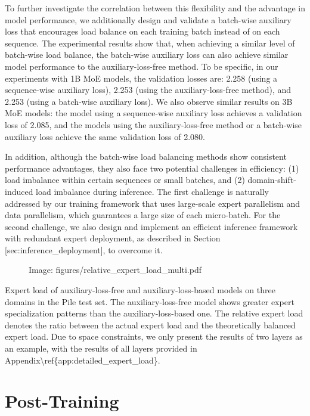 \documentclass[11pt,a4paper]{article}
\begin{document}
To further investigate the correlation between this flexibility and the advantage in model performance, we additionally design and validate a batch-wise auxiliary loss that encourages load balance on each training batch instead of on each sequence. 
The experimental results show that, when achieving a similar level of batch-wise load balance, the batch-wise auxiliary loss can also achieve similar model performance to the auxiliary-loss-free method.
To be specific, in our experiments with 1B MoE models, the validation losses are: 2.258 (using a sequence-wise auxiliary loss), 2.253 (using the auxiliary-loss-free method), and 2.253 (using a batch-wise auxiliary loss). 
We also observe similar results on 3B MoE models: the model using a sequence-wise auxiliary loss achieves a validation loss of 2.085, and the models using the auxiliary-loss-free method or a batch-wise auxiliary loss achieve the same validation loss of 2.080.

In addition, although the batch-wise load balancing methods show consistent performance advantages, they also face two potential challenges in efficiency: 
(1) load imbalance within certain sequences or small batches, and 
(2) domain-shift-induced load imbalance during inference. 
The first challenge is naturally addressed by our training framework that uses large-scale expert parallelism and data parallelism, which guarantees a large size of each micro-batch. 
For the second challenge, we also design and implement an efficient inference framework with redundant expert deployment, as described in Section [sec:inference\_deployment], to overcome it.

\begin{figure}[h]
\caption{Image: figures/relative\_expert\_load\_multi.pdf}
\end{figure}

Expert load of auxiliary-loss-free and auxiliary-loss-based models on three domains in the Pile test set. 
 The auxiliary-loss-free model shows greater expert specialization patterns than the auxiliary-loss-based one.
 The relative expert load denotes the ratio between the actual expert load and the theoretically balanced expert load. 
 Due to space constraints, we only present the results of two layers as an example, with the results of all layers provided in Appendix\textbackslash{}ref\{app:detailed\_expert\_load\}.

\section{Post-Training}
\end{document}
